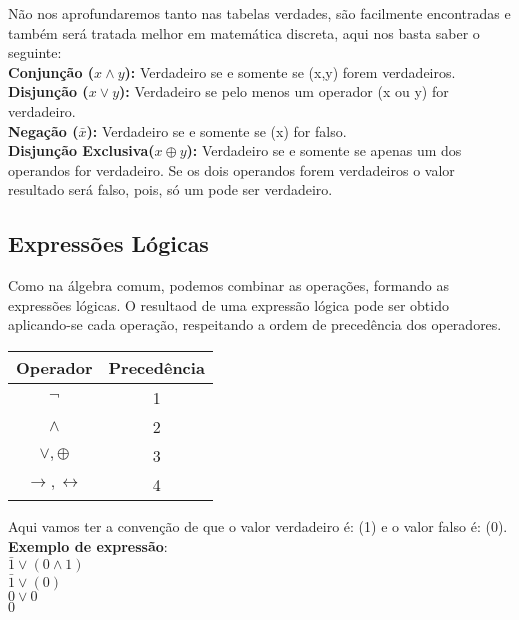 \documentclass[12pt, onecolumn]{article}
\begin{document}
	Não nos aprofundaremos tanto nas tabelas verdades, são facilmente encontradas
	e também será tratada melhor em matemática discreta, aqui nos basta saber o
	seguinte: \\
	\newline
	\textbf{Conjunção ($x \land y$):} Verdadeiro se e somente se (x,y) forem
	verdadeiros. \\
	\newline
	\textbf{Disjunção ($x \lor y$):} Verdadeiro se pelo menos um operador (x ou y) 
	for verdadeiro.\\
	\newline
	\textbf{Negação ($\bar{x}$):} Verdadeiro se e somente se (x) for falso.\\
	\newline
	\textbf{Disjunção Exclusiva($x \oplus y$):} Verdadeiro se e somente se
	apenas um dos operandos for verdadeiro. Se os dois operandos forem verdadeiros
	o valor resultado será falso, pois, só um pode ser verdadeiro.

	\subsection{\centering Expressões Lógicas}
	
	Como na álgebra comum, podemos combinar as operações, formando as expressões
	lógicas. O resultaod de uma expressão lógica pode ser obtido aplicando-se 
	cada operação, respeitando a ordem de precedência dos operadores. \\
	\newline
	\begin{table}[h]
		\centering
		\begin{tabular}{|c|c|}
			\hline
			Operador & Precedência\\ \hline

			$\lnot$ & 1 \\
			$\land$ & 2 \\
			$\lor, \oplus$ & 3 \\
			$\longrightarrow, \longleftrightarrow$ & 4 \\
			\hline
		\end{tabular}
	\end{table}
	Aqui vamos ter a convenção de que o valor verdadeiro é: (1) e o valor
	falso é: (0).\\
	\newline
	\textbf{Exemplo de expressão}: \\
	$\bar{1} \lor (0 \land 1)$\\
	$ \bar{1} \lor (0)$\\
	$0 \lor 0$\\
	$0$
\end{document}
